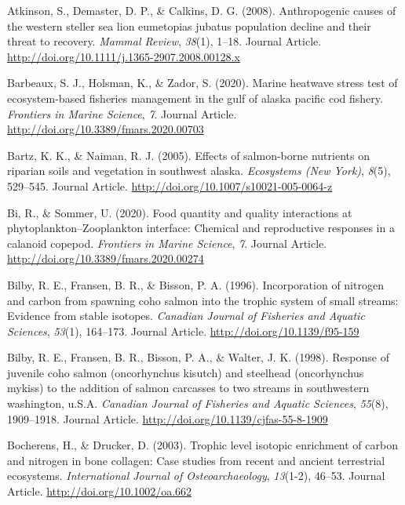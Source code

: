 \documentclass [11pt, proquest] {uwthesis}[2015/03/03]
\begin{document}

\noindent

\setlength{\parindent}{-0.20in} \setlength{\leftskip}{0.20in}
\setlength{\parskip}{8pt}

\hypertarget{refs}{}
\hypertarget{ref-Atkinson2008}{}
Atkinson, S., Demaster, D. P., \& Calkins, D. G. (2008). Anthropogenic
causes of the western steller sea lion eumetopias jubatus population
decline and their threat to recovery. \emph{Mammal Review},
\emph{38}(1), 1--18. Journal Article.
\url{http://doi.org/10.1111/j.1365-2907.2008.00128.x}

\hypertarget{ref-Barbeaux2020}{}
Barbeaux, S. J., Holsman, K., \& Zador, S. (2020). Marine heatwave
stress test of ecosystem-based fisheries management in the gulf of
alaska pacific cod fishery. \emph{Frontiers in Marine Science},
\emph{7}. Journal Article. \url{http://doi.org/10.3389/fmars.2020.00703}

\hypertarget{ref-Bartz2005}{}
Bartz, K. K., \& Naiman, R. J. (2005). Effects of salmon-borne nutrients
on riparian soils and vegetation in southwest alaska. \emph{Ecosystems
(New York)}, \emph{8}(5), 529--545. Journal Article.
\url{http://doi.org/10.1007/s10021-005-0064-z}

\hypertarget{ref-Bi2020}{}
Bi, R., \& Sommer, U. (2020). Food quantity and quality interactions at
phytoplankton--Zooplankton interface: Chemical and reproductive
responses in a calanoid copepod. \emph{Frontiers in Marine Science},
\emph{7}. Journal Article. \url{http://doi.org/10.3389/fmars.2020.00274}

\hypertarget{ref-Bilby1996}{}
Bilby, R. E., Fransen, B. R., \& Bisson, P. A. (1996). Incorporation of
nitrogen and carbon from spawning coho salmon into the trophic system of
small streams: Evidence from stable isotopes. \emph{Canadian Journal of
Fisheries and Aquatic Sciences}, \emph{53}(1), 164--173. Journal
Article. \url{http://doi.org/10.1139/f95-159}

\hypertarget{ref-Bilby1998}{}
Bilby, R. E., Fransen, B. R., Bisson, P. A., \& Walter, J. K. (1998).
Response of juvenile coho salmon (oncorhynchus kisutch) and steelhead
(oncorhynchus mykiss) to the addition of salmon carcasses to two streams
in southwestern washington, u.S.A. \emph{Canadian Journal of Fisheries
and Aquatic Sciences}, \emph{55}(8), 1909--1918. Journal Article.
\url{http://doi.org/10.1139/cjfas-55-8-1909}

\hypertarget{ref-Bocherens2003}{}
Bocherens, H., \& Drucker, D. (2003). Trophic level isotopic enrichment
of carbon and nitrogen in bone collagen: Case studies from recent and
ancient terrestrial ecosystems. \emph{International Journal of
Osteoarchaeology}, \emph{13}(1-2), 46--53. Journal Article.
\url{http://doi.org/10.1002/oa.662}
\end{document}

